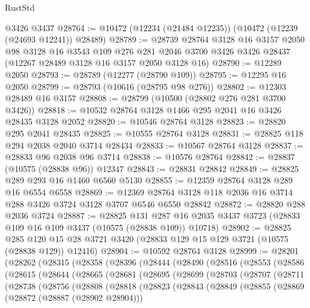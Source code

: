 \begin{lexlean}{RustStd}
\begin{coremodule}
    @3426
    @3437
@28764 := @10472 (@12234 (@21484 @12235)) (@10472 (@12239 (@24693 @12241)) @28489)
@28789 := @28739
    @28764
    @3128
    @16
    @3157
    @2050
    @98
    @3128
    @16
    @3543
    @109
    @276
    @281
    @2046
    @3700
    @3426
    @3426
    @28437
    (@12267 @28489 @3128 @16 @3157 @2050 @3128 @16)
@28790 := @12289 @2050
@28793 := @28789 (@12277 (@28790 @109))
@28795 := @12295 @16 @2050
@28799 := @28793 (@10616 (@28795 @98 @276))
@28802 := @12303 @28489 @16 @3157
@28808 := @28799 (@10500 (@28802 @276 @281 @3700 @3426))
@28818 := @10532 @28764 @3128 @1466 @295 @2041 @16 @3426 @28435 @3128 @2052
@28820 := @10546 @28764 @3128
@28823 := @28820 @295 @2041 @28435
@28825 := @10555 @28764 @3128
@28831 := @28825 @118 @294 @2038 @2040 @3714 @28434
@28833 := @10567 @28764 @3128
@28837 := @28833 @96 @2038 @96 @3714
@28838 := @10576 @28764
@28842 := @28837 (@10575 (@28838 @96)) @12347
@28843 := @28831 @28842
@28849 := @28825 @289 @293 @16 @1460 @6560 @5130
@28855 := @12359 @28764 @3128 @289 @16 @6554 @6558
@28869 := @12369 @28764 @3128 @118 @2036 @16 @3714 @288 @3426 @3724 @3128 @3707 @6546 @6550 @28842
@28872 := @28820 @288 @2036 @3724
@28887 := @28825
    @131
    @287
    @16
    @2035
    @3437
    @3723
    (@28833 @109 @16 @109 @3437 (@10575 (@28838 @109)) @10718)
@28902 := @28825
    @285
    @120
    @15
    @28
    @3721
    @3420
    (@28833 @129 @15 @129 @3721 (@10575 (@28838 @129)) @12416)
@28904 := @10592 @28764 @3128
@28999 := @28201
    (@28262
      (@28315
        (@28358
          (@28396
            (@28444
              (@28490
                (@28516
                  (@28553
                    (@28586
                      (@28615
                        (@28644
                          (@28665
                            (@28681
                              (@28695
                                (@28699
                                  (@28703
                                    (@28707
                                      (@28711
                                        (@28738
                                          (@28756
                                            (@28808
                                              (@28818
                                                (@28823
                                                  (@28843
                                                    (@28849
                                                      (@28855
                                                        (@28869
                                                          (@28872 (@28887 (@28902 @28904)))

\end{coremodule}
\end{lexlean}
